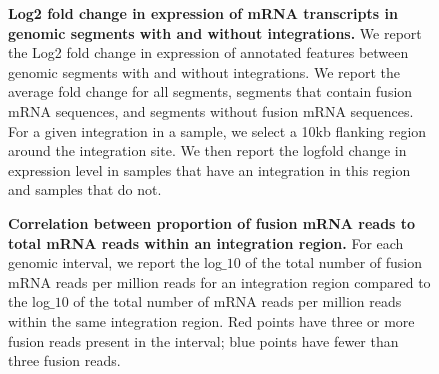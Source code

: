 \documentclass[12pt]{article}
\begin{document}

\begin{figure}[htpb]
 \centering
\caption[Expression of mRNA transcripts in genomic segments with and without integrations.]
{\label{expression_transcripts_type}  {\bf Log2 fold change in expression of mRNA transcripts in genomic segments with and without integrations.}  We report the Log2 fold change in expression of annotated features between genomic segments with and without integrations.  We report the average fold change for all segments, segments that contain fusion mRNA sequences, and segments without fusion mRNA sequences.  For a given integration in a sample, we select a 10kb flanking region around the integration site.  We then report the logfold change in expression level in samples that have an integration in this region and samples that do not.}
\end{figure}

\begin{figure}[htpb]
  \centering
\caption[Correlation between number fusion mRNA reads per million to total mRNA reads per million.]  {\label{corr_plot} {\bf Correlation between proportion of fusion mRNA reads to total mRNA reads within an integration region.}  For each genomic interval, we report the log$\_10$ of the total number of fusion mRNA reads per million reads for an integration region compared to the log$\_10$ of the total number of mRNA reads per million reads within the same integration region.  Red points have three or more fusion reads present in the interval; blue points have fewer than three fusion reads.}
\end{figure}
\end{document}
